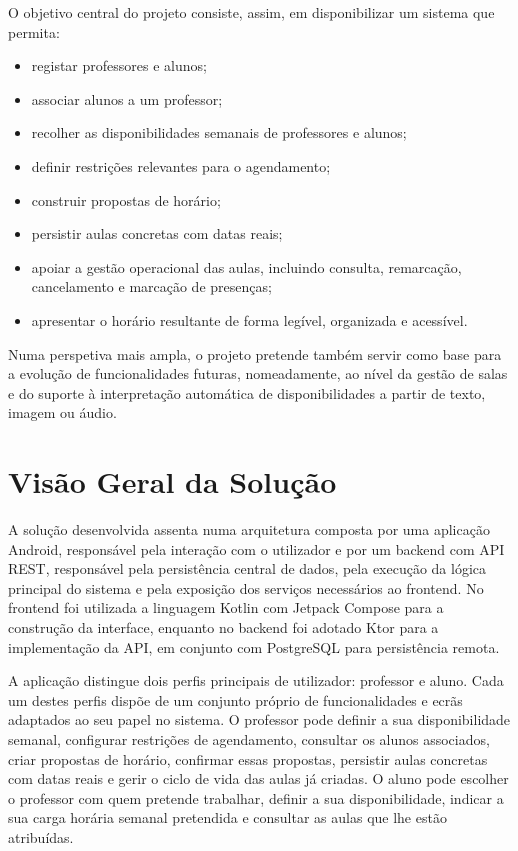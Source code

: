 O objetivo central do projeto consiste, assim, em disponibilizar um sistema que permita:

\begin{itemize}
    \item registar professores e alunos;
    \item associar alunos a um professor;
    \item recolher as disponibilidades semanais de professores e alunos;
    \item definir restrições relevantes para o agendamento;
    \item construir propostas de horário;
    \item persistir aulas concretas com datas reais;
    \item apoiar a gestão operacional das aulas, incluindo consulta, remarcação, cancelamento e marcação de presenças;
    \item apresentar o horário resultante de forma legível, organizada e acessível.
\end{itemize}

Numa perspetiva mais ampla, o projeto pretende também servir como base para a evolução de funcionalidades futuras, nomeadamente, ao nível da gestão de salas e do suporte à interpretação automática de disponibilidades a partir de texto, imagem ou áudio.

%
%
\section{Visão Geral da Solução} \label{sec12}

A solução desenvolvida assenta numa arquitetura composta por uma aplicação Android, responsável pela interação com o utilizador e por um backend com API REST, responsável pela persistência central de dados, pela execução da lógica principal do sistema e pela exposição dos serviços necessários ao frontend. No frontend foi utilizada a linguagem Kotlin com Jetpack Compose para a construção da interface, enquanto no backend foi adotado Ktor para a implementação da API, em conjunto com PostgreSQL para persistência remota.

A aplicação distingue dois perfis principais de utilizador: professor e aluno. Cada um destes perfis dispõe de um conjunto próprio de funcionalidades e ecrãs adaptados ao seu papel no sistema. O professor pode definir a sua disponibilidade semanal, configurar restrições de agendamento, consultar os alunos associados, criar propostas de horário, confirmar essas propostas, persistir aulas concretas com datas reais e gerir o ciclo de vida das aulas já criadas. O aluno pode escolher o professor com quem pretende trabalhar, definir a sua disponibilidade, indicar a sua carga horária semanal pretendida e consultar as aulas que lhe estão atribuídas.

